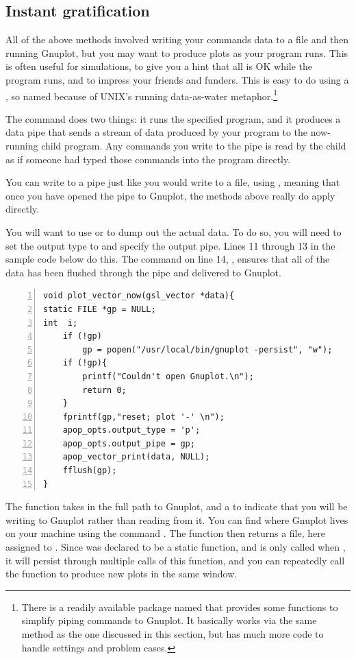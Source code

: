 \subsection{\treesymbol Instant gratification} \label{popen}
All of the above methods involved writing your commands data to a file and then 
running Gnuplot, but you may want to produce plots as your program runs.
This is often useful for simulations, to give you a hint that all is OK
while the program runs, and to impress your friends and funders. This is
easy to do using a , so named because of UNIX's running
data-as-water metaphor.\footnote{There is a readily available
package named  that provides some functions to simplify
piping commands to Gnuplot. It basically works via the same method as
the one discussed in this section, but has much more code to handle
settings and problem cases.}

The command  does two things: it runs the specified program,
and it produces a data pipe that sends a stream of data produced by your
program to the now-running child program. Any commands you write to the
pipe is read by the child as if someone had typed those commands into
the program directly.

You can write to a pipe just like you would write to a file, using
, meaning that once you have opened the pipe to
Gnuplot, the methods above really do apply directly.

You will want to use  or
 to dump out the actual data. To do so, you
will need to set the output type to  and specify the output
pipe. Lines 11 through 13 in the sample code below do this.
The command on line 14, , ensures that all of the data has
been flushed through the pipe and delivered to Gnuplot.

\label{pipeexample}
\begin{lstlisting}[numbers=left, numberstyle=\scshape]
void plot_vector_now(gsl_vector *data){
static FILE *gp = NULL;
int  i;
    if (!gp)
        gp = popen("/usr/local/bin/gnuplot -persist", "w");
    if (!gp){
        printf("Couldn't open Gnuplot.\n");
        return 0;
    }
    fprintf(gp,"reset; plot '-' \n");
    apop_opts.output_type = 'p';
    apop_opts.output_pipe = gp;
    apop_vector_print(data, NULL);
    fflush(gp);
}
\end{lstlisting} 

The  function takes in the full path to Gnuplot, and a 
to indicate that you will be writing to Gnuplot rather than reading from
it. You can find where Gnuplot lives on your machine using the command
. The  function then returns a file, here
assigned to . Since  was declared to be a static function,
and  is only called when ,
it will persist through multiple calls of this function, and you can
repeatedly call the function to produce new plots in the same window.

